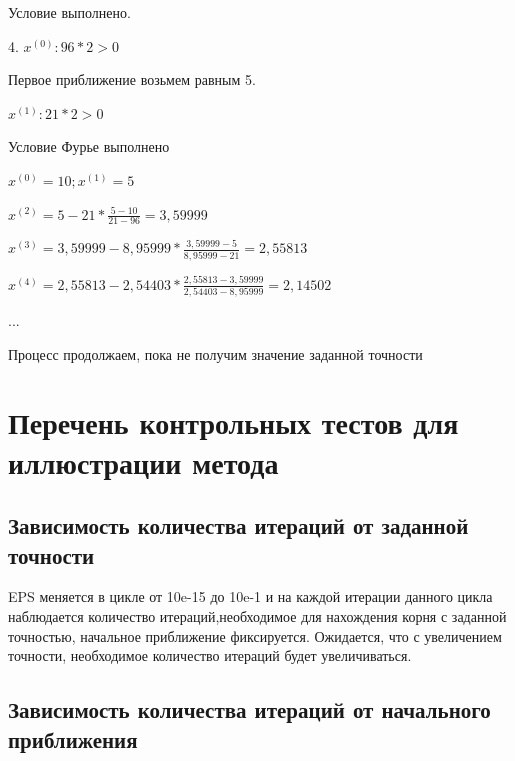 Условие выполнено.

4. \begin{math}
	x^{(0)}:96*2>0
\end{math}

Первое приближение возьмем равным 5. 

\begin{math}
	x^{(1)}:21*2>0
\end{math}

Условие Фурье выполнено

\begin{math}
	x^{(0)}=10; x^{(1)}=5
	\end{math}

\begin{math}
	x^{(2)}=5-21*\frac{5-10}{21-96}=3,59999
\end{math}

\begin{math}
	x^{(3)}=3,59999-8,95999*\frac{3,59999-5}{8,95999-21}=2,55813
\end{math}

\begin{math}
	x^{(4)}=2,55813-2,54403*\frac{2,55813-3,59999}{2,54403-8,95999}=2,14502
\end{math}

\begin{math}
	...
\end{math}

Процесс продолжаем, пока не получим значение заданной точности
\section{Перечень контрольных тестов для иллюстрации метода}

\subsection{Зависимость количества итераций от заданной точности}

EPS меняется в цикле от 10e-15 до 10e-1 и на каждой итерации данного цикла наблюдается количество итераций,необходимое для нахождения корня с заданной точностью, начальное приближение фиксируется. Ожидается, что с увеличением точности, необходимое количество итераций будет увеличиваться.

\subsection{Зависимость количества итераций от начального приближения}

